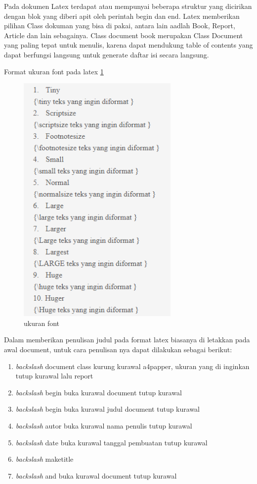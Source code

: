 Pada dokumen Latex terdapat atau mempunyai beberapa struktur yang dicirikan dengan blok yang diberi apit oleh perintah begin dan end. Latex memberikan pilihan Class dokuman yang bisa di pakai, antara lain aadlah Book, Report, Article dan lain sebagainya. Class document book merupakan Class Document yang paling tepat untuk menulis, karena dapat mendukung table of contents yang dapat berfungsi langsung untuk generate daftar isi secara langsung.


Format ukuran font pada latex \ref{labelgambar1}

\begin{figure}[ht]
\centerline{\includegraphics[width=0.7\textwidth]{figures/1.PNG}}
\caption{ukuran font}
\label{labelgambar1}
\end{figure}

Dalam memberikan penulisan judul pada format latex biasanya di letakkan pada awal document, untuk cara penulisan nya dapat dilakukan sebagai berikut:
\begin{enumerate}
  \item \textit{backslash} document class kurung kurawal a4papper, ukuran yang di inginkan tutup kurawal lalu report
  \item \textit{backslash} begin buka kurawal document tutup kurawal
  \item \textit{backslash} begin buka kurawal judul document tutup kurawal
  \item \textit{backslash} autor buka kurawal nama penulis tutup kurawal
  \item \textit{backslash} date buka kurawal tanggal pembuatan tutup kurawal
  \item \textit{backslash} maketitle
  \item \textit{backslash} and buka kurawal document tutup kurawal
\end{enumerate}

